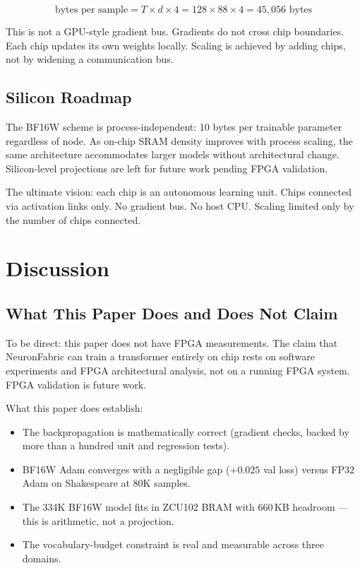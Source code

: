 \documentclass[11pt]{article}
\begin{document}
\begin{equation}
\text{bytes per sample} = T \times d \times 4 = 128 \times 88 \times 4 = 45{,}056 \text{ bytes}
\end{equation}

This is not a GPU-style gradient bus. Gradients do not cross chip boundaries.
Each chip updates its own weights locally. Scaling is achieved by adding chips,
not by widening a communication bus.

\subsection{Silicon Roadmap}

The BF16W scheme is process-independent: 10 bytes per trainable parameter regardless of node.
As on-chip SRAM density improves with process scaling, the same architecture accommodates
larger models without architectural change. Silicon-level projections are left for future work
pending FPGA validation.

The ultimate vision: each chip is an autonomous learning unit. Chips connected via activation
links only. No gradient bus. No host CPU. Scaling limited only by the number of chips connected.

\section{Discussion}

\subsection{What This Paper Does and Does Not Claim}

To be direct: this paper does not have FPGA measurements. The claim that NeuronFabric
can train a transformer entirely on chip rests on software experiments and FPGA
architectural analysis, not on a running FPGA system. FPGA validation is future work.

What this paper does establish:

\begin{itemize}
  \item The backpropagation is mathematically correct (gradient checks, backed by more than a hundred unit and regression tests).
  \item BF16W Adam converges with a negligible gap ($+0.025$ val loss) versus FP32 Adam on Shakespeare at 80K samples.
  \item The 334K BF16W model fits in ZCU102 BRAM with 660\,KB headroom --- this is
    arithmetic, not a projection.
  \item The vocabulary-budget constraint is real and measurable across three domains.
\end{itemize}
\end{document}
